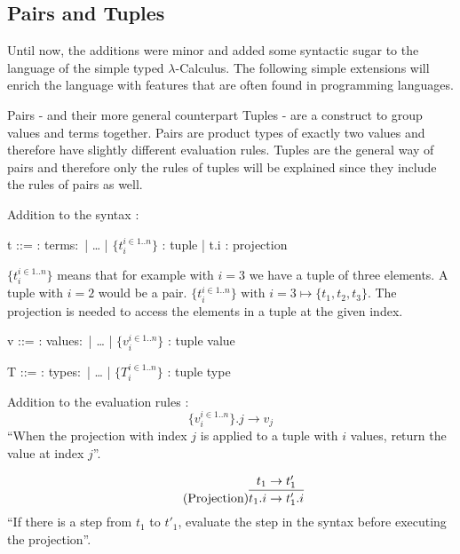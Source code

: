 \subsection{Pairs and Tuples}

Until now, the additions were minor and added some syntactic sugar to the language of
the simple typed $\lambda$-Calculus. The following simple extensions will enrich
the language with features that are often found in programming languages.

Pairs - and their more general counterpart Tuples - are a construct to group
values and terms together. Pairs are product types of exactly two values
and therefore have slightly different evaluation rules. Tuples are the general way
of pairs and therefore only the rules of tuples will be explained since they include
the rules of pairs as well.

Addition to the syntax \cite{pierce2002ProgLang}:
\begin{bnfgrammar}
    t ::= : terms$\colon$
    | \dots
    | $\{t_i^{i \in 1..n}\}$ : tuple
    | t.i : projection
\end{bnfgrammar}\leavevmode\newline
$\{t_i^{i \in 1..n}\}$ means that for example with $i=3$ we have a tuple
of three elements. A tuple with $i=2$ would be a pair.
$\{t_i^{i \in 1..n}\} \text{ with } i=3 \mapsto \{t_1, t_2, t_3\}$.
The projection is needed to access the elements in a tuple at the given index.

\begin{bnfgrammar}
    v ::= : values$\colon$
    | \dots
    | $\{v_i^{i \in 1..n}\}$ : tuple value
\end{bnfgrammar}\leavevmode\newline

\begin{bnfgrammar}
    T ::= : types$\colon$
    | \dots
    | $\{T_i^{i \in 1..n}\}$ : tuple type
\end{bnfgrammar}\leavevmode\newline

Addition to the evaluation rules \cite{pierce2002ProgLang}:
\begin{equation*}
    \tag{Tuple projection}
    \{v_i^{i \in 1..n}\} . j \rightarrow v_j
\end{equation*}
``When the projection with index $j$ is applied to a tuple with
$i$ values, return the value at index $j$''.

\begin{equation*}
    \tag{Projection}
    \infer{
        t_1 . i \rightarrow t'_1 . i
    }{
        t_1 \rightarrow t'_1
    }
\end{equation*}
``If there is a step from $t_1$ to $t'_1$, evaluate the step
in the syntax before executing the projection''.

